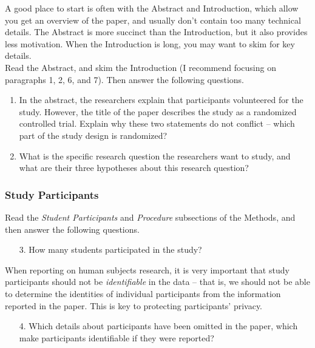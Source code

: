 \documentclass[12pt]{article}
\begin{document}
A good place to start is often with the Abstract and Introduction, which allow you get an overview of the paper, and usually don't contain too many technical details. The Abstract is more succinct than the Introduction, but it also provides less motivation. When the Introduction is long, you may want to skim for key details.\\

\noindent Read the Abstract, and skim the Introduction (I recommend focusing on paragraphs 1, 2, 6, and 7). Then answer the following questions.

\begin{enumerate}
    \item In the abstract, the researchers explain that participants volunteered for the study. However, the title of the paper describes the study as a randomized controlled trial. Explain why these two statements do not conflict -- which part of the study design is randomized?
    
    \item What is the specific research question the researchers want to study, and what are their three hypotheses about this research question?
\end{enumerate}

\subsubsection*{Study Participants}

Read the \textit{Student Participants} and \textit{Procedure} subsections of the Methods, and then answer the following questions.

\begin{enumerate}
    \item[3.]  How many students participated in the study?
\end{enumerate}

\noindent When reporting on human subjects research, it is very important that study participants should not be \textit{identifiable} in the data -- that is, we should not be able to determine the identities of individual participants from the information reported in the paper. This is key to protecting participants' privacy.

\begin{enumerate}
    \item[4.] Which details about participants have been omitted in the paper, which make participants identifiable if they were reported?
\end{enumerate}
\end{document}
